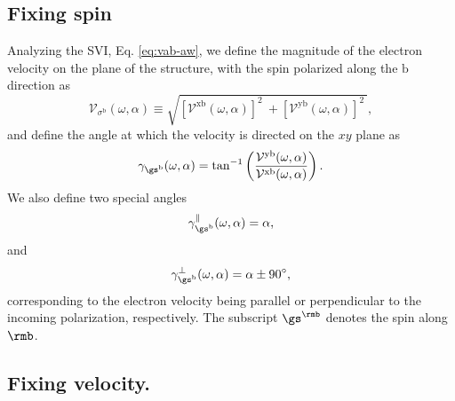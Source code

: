 \documentclass[floatfix,prb,aps,superscriptaddress,showpacs,11pt,preprint,letterpaper]{revtex4}
\begin{document}
\subsection{Fixing spin}\label{sec:theory-fixspin}

Analyzing the SVI, Eq. \eqref{eq:vab-aw}, we define the magnitude of
the electron velocity on the plane of the structure,
with the spin polarized along the $\mathrm{b}$ direction as
\begin{equation}
\mathcal{V}_{\sigma^{\mathrm{b}}}(\omega,\alpha)
\equiv
\sqrt{
[\mathcal{V}^{\mathrm{xb}}(\omega,\alpha)]^{2}\ +
[\mathcal{V}^{\mathrm{yb}}(\omega,\alpha)]^{2}\ 
}, 
\label{eq:vs-mag}
\end{equation}
and define the angle at which the velocity is directed on the $xy$ plane as
\begin{equation}
\gamma_{\gs^\mathrm{b}} (\omega,\alpha)
=
\tan^{-1} \left( \frac{\mathcal{V}^{\mathrm{yb}}(\omega,\alpha)}
{\mathcal{V}^{\mathrm{xb}}(\omega,\alpha)} \right)
.
\label{eq:gamma-ang}
\end{equation}
We also define two special angles
\begin{equation}
\gamma_{\gs^\mathrm{b}}^\parallel(\omega,\alpha) = \alpha, 
\label{eq:gamma-par} 
\end{equation}
and
\begin{equation}
\gamma_{\gs^\mathrm{b}}^\perp(\omega,\alpha) = \alpha \pm 90^{\circ},
\label{eq:gamma-perp}
\end{equation}
corresponding to the electron velocity being parallel or perpendicular
to the incoming polarization, 
respectively. The subscript $\gs^\rmb$ denotes the spin along $\rmb$.



\subsection{Fixing velocity.}\label{sec:theory-fixvel}
\end{document}
